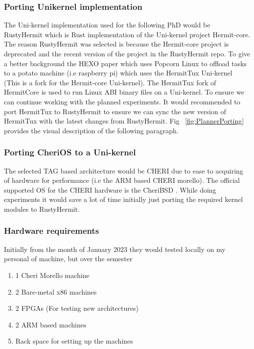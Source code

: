 \subsubsection{Porting Unikernel implementation}
The Uni-kernel implementation used for the following PhD would be RustyHermit 
which is Rust implementation of the Uni-kernel project Hermit-core. The reason 
RustyHermit was selected is because the Hermit-core project is deprecated and 
the recent version of the project in the RustyHermit repo. To give a better 
background the HEXO paper \cite{HEXO} which uses Popcorn Linux to offload 
tasks to a potato machine (i.e raspberry pi) which uses the HermitTux Uni-kernel (This 
is a fork for the Hermit-core Uni-kernel). The HermitTux fork of HermitCore is used to 
run Linux ABI binary files on a Uni-kernel. To ensure we can continue working with the
planned experiments. It would recommended to port HermitTux to RustyHermit to ensure we 
can sync the new version of HermitTux with the latest changes from RustyHermit. Fig ~\ref{fig:PlannerPorting}
 provides the visual description of the following paragraph. 

\subsubsection{Porting CheriOS to a Uni-kernel}
The selected TAG based architecture would be CHERI due to ease to acquiring of hardware 
for performance (i.e the ARM based CHERI morello). The official supported OS for 
the CHERI hardware is the CheriBSD \cite{CHERIBSD}. While doing experiments it 
would save a lot of time initially just porting the required kernel modules to 
RustyHermit.

\subsubsection{Hardware requirements}
Initially from the month of January 2023 they would tested locally on 
my personal of machine, but over the semester 
\begin{enumerate}
  \item 1 Cheri Morello machine 
  \item 2 Bare-metal x86 machines
  \item 2 FPGAs (For testing new architectures)
  \item 2 ARM based machines
  \item Rack space for setting up the machines 
\end{enumerate}

